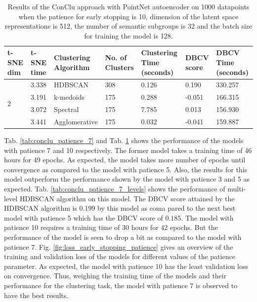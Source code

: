 \begin{table}[H]
  \setlength\extrarowheight{10pt}
  \caption{Results of the ConClu approach with PointNet autoencoder on 1000 datapoints when the patience for early stopping is 10, dimension of the latent space representations is 512, the number of semantic subgroups is 32 and the batch size for training the model is 128. }
  \centering
  \begin{tabular}{|p{30pt}|p{50pt}|p{60pt}|p{50pt}|p{50pt}|p{50pt}|p{40pt}|}
    \toprule
    \ac{t-SNE} dim	& \ac{t-SNE} time & Clustering Algorithm & No. of Clusters & Clustering Time (seconds) & \ac{DBCV} score & \ac{DBCV} Time (seconds)\\
    \midrule
    \multirow{4}{30pt}{2}	& 3.338	& \ac{HDBSCAN}	& 308	& 0.126	& 0.190	& 330.257 \\ \cline{2-7} 
    & 3.191	& k-medoids	& 175	& 0.288	& -0.051	& 166.315 \\ \cline{2-7} 
    & 3.072	& Spectral	& 175	& 7.785	& 0.013	& 156.930 \\ \cline{2-7}
    & 3.441	& Agglomerative	& 175	& 0.032	& -0.041	& 159.887 \\ 
    \bottomrule
  \end{tabular}
  \label{tab:conclu_patience_10}
\end{table}

Tab. \ref{tab:conclu_patience_7} and Tab. \ref{tab:conclu_patience_10} shows the performance of the models with patience 7 and 10 respectively. The former model takes a training time of 46 hours for 49 epochs. As expected, the model takes more number of epochs until convergence as compared to the model with patience 5. Also, the results for this model outperform the performance shown by the model with patience 3 and 5 as expected. Tab. \ref{tab:conclu_patience_7_levels} shows the performance of multi-level \ac{HDBSCAN} algorithm on this model. The \ac{DBCV} score attained by the \ac{HDBSCAN} algorithm is 0.199 by this model as coma
pared to the next best model with patience 5 which has the \ac{DBCV} score of 0.185. The model with patience 10 requires a training time of 30 hours for 42 epochs. But the performance of the model is seen to drop a bit as compared to the model with patience 7. Fig. \ref{fig:loss_early_stopping_patience} gives an overview of the training and validation loss of the models for different values of the patience parameter. As expected, the model with patience 10 has the least validation loss on convergence. Thus, weighing the training time of the models and their performance for the clustering task, the model with patience 7 is observed to have the best results. 

